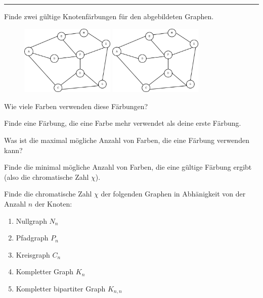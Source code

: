 

\usepackage{pstricks,pst-node,pst-tree}





  \sheet[%
  number=2,
      topic={F\"arbung von Graphen},
    ]

\vspace{-1cm}
\noindent\rule{12cm}{0.4pt}

  \exercise[%
  topic = Knotenf\"arbung 
    ]

%



 \subexercise[%
  topic=Einen Graphen f\"arben,
    ]

Finde zwei g\"ultige Knotenf\"arbungen f\"ur den abgebildeten Graphen.

\begin{figure}[h]
\includegraphics[width=0.4\textwidth]{graph_colouring.eps}
\includegraphics[width=0.4\textwidth]{graph_colouring.eps}
\end{figure}

Wie viele Farben verwenden diese F\"arbungen?

Finde eine F\"arbung, die eine Farbe mehr verwendet als deine erste F\"arbung.

Was ist die maximal m\"ogliche Anzahl von Farben, die eine F\"arbung verwenden kann?

Finde die minimal m\"ogliche Anzahl von Farben, die eine g\"ultige F\"arbung
ergibt (also die chromatische Zahl $\chi$).

\subexercise[%
  topic=Chromatische Zahl bestimmter Graphen,
    ]
		\label{subseq:graphen}
Finde die chromatische Zahl $\chi$ der folgenden Graphen in Abh\"anigkeit von der Anzahl $n$ der Knoten:
\begin{enumerate}
\item Nullgraph $N_n$
\item Pfadgraph $P_n$
\item Kreisgraph $C_n$
\item Kompletter Graph $K_n$
\item Kompletter bipartiter Graph $K_{n,n}$
\end{enumerate}

